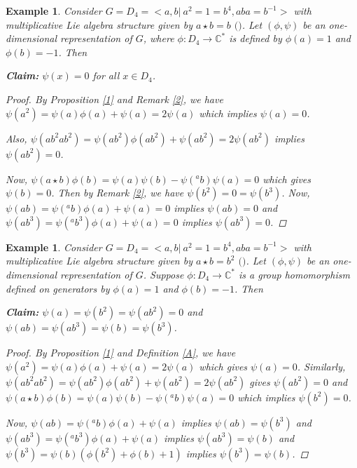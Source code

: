 \documentclass[10 pt,oneside,reqno,a4paper]{amsart}
\newtheorem{example}[theorem]{Example}
\numberwithin{equation}{section}
\newcommand{\field}[1]{\mathbb{#1}}          \newcommand{\Q}{\field{Q}}
\newcommand{\C}{\field{C}}                   \newcommand{\A}{\field{A}}
\begin{document}
\begin{example} 
    Consider $G=D_4=<a,b|~ a^2=1=b^4, aba=b^{-1}>$ with multiplicative Lie algebra structure given by $a\star b=b$ $($\cite{MS1}$)$. Let $(\phi,\psi)$ be an one-dimensional representation of $G$, where $\phi:D_4 \to \C^*$ is defined by $\phi(a)=1$ and $\phi(b)=-1$. Then
    
    \noindent\textbf{Claim:} $\psi(x)=0$ for all $x\in D_4$.
    \begin{proof}
   By Proposition \ref{1} and Remark \ref{2}, we have $\psi(a^2)=\psi(a)\phi(a)+ \psi(a)=2 \psi(a)$ which implies $\psi(a)=0$.

  Also, $\psi(ab^2ab^2)=\psi(ab^2)\phi(ab^2)+ \psi(ab^2)=2 \psi(ab^2)$ implies $\psi(ab^2)=0$. 
  
  Now, $\psi(a\star b)\phi(b)=\psi(a)\psi(b)-\psi({^ab})\psi(a)=0$ which gives $\psi(b)=0$. Then by Remark \ref{2}, we have $\psi(b^2)=0=\psi(b^3)$. Now, $\psi(ab)=\psi({^ab})\phi(a)+\psi(a)=0$ implies $\psi(ab)=0$ and $\psi(ab^3)=\psi({^ab^3})\phi(a)+\psi(a)=0$ implies $\psi(ab^3)=0$.
        
    \end{proof}
 
\end{example}

\begin{example}
    Consider $G=D_4=<a,b|~ a^2=1=b^4, aba=b^{-1}>$ with multiplicative Lie algebra structure given by $a\star b=b^2$ $($\cite{MS1}$)$. Let $(\phi,\psi)$ be an one-dimensional representation of $G$.
    Suppose $\phi:D_4 \to \C^*$ is a group homomorphism defined on generators by $\phi(a)=1$ and $\phi(b)=-1$. Then 

    \textbf{Claim:} $\psi(a)=\psi(b^2)= \psi(ab^2)=0$ and $\psi(ab)=\psi(ab^3)=\psi(b)=\psi(b^3) $.
    \begin{proof}
        By Proposition \ref{1} and Definition \ref{A}, we have $\psi(a^2)=\psi(a)\phi(a)+ \psi(a)=2 \psi(a)$ which gives $\psi(a)=0$.
        Similarly, $\psi(ab^2ab^2)=\psi(ab^2)\phi(ab^2)+ \psi(ab^2)=2 \psi(ab^2)$ gives $\psi(ab^2)=0$ and $\psi(a\star b)\phi(b)=\psi(a)\psi(b)-\psi({^ab})\psi(a)=0$ which implies $\psi(b^2)=0$. 
        
        Now, $\psi(ab)=\psi({^ab})\phi(a)+\psi(a)$ implies $\psi(ab)=\psi(b^3)$ and $\psi(ab^3)=\psi({^ab^3})\phi(a)+\psi(a)$ implies $\psi(ab^3)=\psi(b)$ and $\psi(b^3)=\psi(b)(\phi(b^2)+ \phi(b)+ 1)$ implies $\psi(b^3)=\psi(b)$.
    \end{proof}
\end{example}
\end{document}
